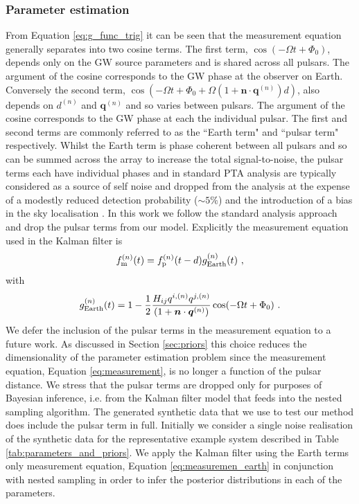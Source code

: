 \documentclass[fleqn,usenatbib,useAMS]{mnras}
\begin{document}
\subsubsection{Parameter estimation}\label{sec:parameter_estim}
From Equation \eqref{eq:g_func_trig} it can be seen that the measurement equation generally separates into two cosine terms. The first term, $\cos(-\Omega t + \Phi_0)$, depends only on the GW source parameters and is shared across all pulsars. The argument of the cosine corresponds to the GW phase at the observer on Earth.  Conversely the second term, $\cos \left(-\Omega t +\Phi_0 + \Omega \left(1 + \boldsymbol{n}\cdot \boldsymbol{q}^{(n)} \right)  d \right)$, also depends on $d^{(n)}$ and $\boldsymbol{q}^{(n)}$ and so varies between pulsars. The argument of the cosine corresponds to the GW phase at each the individual pulsar. The first and second terms are commonly referred to as the ``Earth term" and ``pulsar term" respectively. Whilst the Earth term is phase coherent between all pulsars and so can be summed across the array to increase the total signal-to-noise, the pulsar terms each have individual phases and in standard PTA analysis are typically considered as a source of self noise and dropped from the analysis \citep[e.g.][]{Sesana2010,Babak2012,Petiteau2013,Zhu2015,Taylors2016,Goldstein2018,Charisi2023arXiv230403786C} at the expense of a modestly reduced detection probability ($\sim 5 \%$) and the introduction of a bias in the sky localisation \citep{Zhupulsarterms,Chen2022}. In this work we follow the standard analysis approach and drop the pulsar terms from our model. Explicitly the measurement equation used in the Kalman filter is
\begin{equation}
		f_{\rm m}^{(n)}(t) = f_{\rm p}^{(n)}(t-d) g^{(n)}_{\rm Earth}(t) \ , 
		\label{eq:measuremen_earth}
	\end{equation}
	with
	\begin{equation}
		g^{(n)}_{\rm Earth}(t) = 1 - \frac{1}{2} \frac{ H_{ij}q^{i,(n)} q^{j,(n)}}{(1 + \boldsymbol{n}\cdot \boldsymbol{q}^{(n)}) }  \cos(-\Omega t +\Phi_0)  \ .
		\label{eq:g_func_trig_earth}
	\end{equation}
	We defer the inclusion of the pulsar terms in the measurement equation to a future work. As discussed in Section \ref{sec:priors} this choice reduces the dimensionality of the parameter estimation problem since the measurement equation, Equation \eqref{eq:measurement}, is no longer a function of the pulsar distance.  We stress that the pulsar terms are dropped only for purposes of Bayesian inference, i.e. from the Kalman filter model that feeds into the nested sampling algorithm. The generated synthetic data that we use to test our method does include the pulsar term in full. Initially we consider a single noise realisation of the synthetic data for the representative example system described in Table \ref{tab:parameters_and_priors}. We apply the Kalman filter using the Earth terms only measurement equation, Equation \eqref{eq:measuremen_earth} in conjunction with nested sampling in order to infer the posterior distributions in each of the parameters. \newline 
\end{document}
